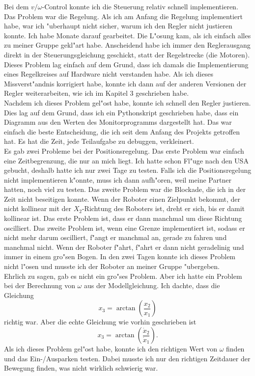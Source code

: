 Bei dem \(v/\omega\)-Control konnte ich die Steuerung relativ schnell implementieren. Das Problem war die Regelung. Als ich am Anfang die Regelung implementiert habe, war ich "uberhaupt nicht sicher, warum ich den Regler nicht justieren konnte. Ich habe Monate darauf gearbeitet. Die L"osung kam, als ich einfach alles zu meiner Gruppe gekl"art habe. Anscheidend habe ich immer den Reglerausgang direkt in der Steuerungsgleichung geschickt, statt der Regelstrecke (die Motoren). Dieses Problem lag einfach auf dem Grund, dass ich damals die Implementierung eines Regelkreises auf Hardware nicht verstanden habe. Als ich dieses Missverst"andnis korrigiert habe, konnte ich dann auf der anderen Versionen der Regler weiterarbeiten, wie ich im Kapitel 3 geschrieben habe. \\

Nachdem ich dieses Problem gel"ost habe, konnte ich schnell den Regler justieren. Dies lag auf dem Grund, dass ich ein Pythonskript geschrieben habe, dass ein Diagramm aus den Werten des Monitorprogramms dargestellt hat. Das war einfach die beste Entscheidung, die ich seit dem Anfang des Projekts getroffen hat. Es hat die Zeit, jede Teilaufgabe zu debuggen, verkleinert. \\

Es gab zwei Probleme bei der Positionsregelung. Das erste Problem war einfach eine Zeitbegrenzung, die nur an mich liegt. Ich hatte schon Fl"uge nach den USA gebucht, deshalb hatte ich nur zwei Tage zu testen. Falls ich die Positionsregelung nicht implementieren k"onnte, muss ich dann aufh"oren, weil meine Partner hatten, noch viel zu testen. Das zweite Problem war die Blockade, die ich in der Zeit nicht beseitigen konnte. Wenn der Roboter einen Zielpunkt bekommt, der nicht kollinear mit der \(X_2\)-Richtung des Roboters ist, dreht er sich, bis er damit kollinear ist. Das erste Problem ist, dass er dann manchmal um diese Richtung oscilliert. Das zweite Problem ist, wenn eine Grenze implementiert ist, sodass er nicht mehr darum oscilliert, f"angt er manchmal an, gerade zu fahren und manchmal nicht. Wenn der Roboter f"ahrt, f"ahrt er dann nicht geradelinig und immer in einem gro"sen Bogen. In den zwei Tagen konnte ich dieses Problem nicht l"osen und musste ich der Roboter an meiner Gruppe "ubergeben. \\

Ehrlich zu sagen, gab es nicht ein gro"ses Problem. Aber ich hatte ein Problem bei der Berechnung von \(\omega\) aus der Modellgleichung. Ich dachte, dass die Gleichung 
\begin{equation*}
    x_3 = \arctan(\frac{x_2}{x_1})
\end{equation*}
richtig war. Aber die echte Gleichung wie vorhin geschrieben ist
\begin{equation*}
    x_3 = \arctan(\frac{\dot{x}_2}{\dot{x}_1}).
\end{equation*}
Als ich dieses Problem gel"ost habe, konnte ich den richtigen Wert von \(\omega\) finden und das Ein-/Ausparken testen. Dabei musste ich nur den richtigen Zeitdauer der Bewegung finden, was nicht wirklich schwierig war.